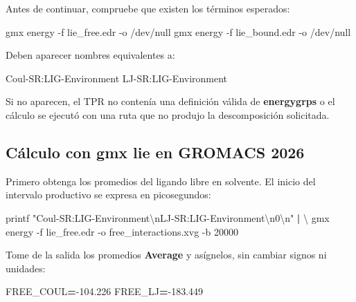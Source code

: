 \documentclass[
  spanish,
  11pt,
  a4paper]{article}
\newenvironment{Shaded}{\begin{snugshade}}{\end{snugshade}}
\newcommand{\AttributeTok}[1]{\textcolor[rgb]{0.13,0.29,0.53}{#1}}
\newcommand{\BuiltInTok}[1]{#1}
\newcommand{\DataTypeTok}[1]{\textcolor[rgb]{0.13,0.29,0.53}{#1}}
\newcommand{\ExtensionTok}[1]{#1}
\newcommand{\KeywordTok}[1]{\textcolor[rgb]{0.13,0.29,0.53}{\textbf{#1}}}
\newcommand{\NormalTok}[1]{#1}
\newcommand{\OperatorTok}[1]{\textcolor[rgb]{0.81,0.36,0.00}{\textbf{#1}}}
\newcommand{\StringTok}[1]{\textcolor[rgb]{0.31,0.60,0.02}{#1}}
\newcommand{\VariableTok}[1]{\textcolor[rgb]{0.00,0.00,0.00}{#1}}
\begin{document}
Antes de continuar, compruebe que existen los términos esperados:

\begin{Shaded}
\begin{Highlighting}[]
\ExtensionTok{gmx}\NormalTok{ energy }\AttributeTok{{-}f}\NormalTok{ lie\_free.edr }\AttributeTok{{-}o}\NormalTok{ /dev/null}
\ExtensionTok{gmx}\NormalTok{ energy }\AttributeTok{{-}f}\NormalTok{ lie\_bound.edr }\AttributeTok{{-}o}\NormalTok{ /dev/null}
\end{Highlighting}
\end{Shaded}

Deben aparecer nombres equivalentes a:

\begin{Shaded}
\begin{Highlighting}[]
\NormalTok{Coul{-}SR:LIG{-}Environment}
\NormalTok{LJ{-}SR:LIG{-}Environment}
\end{Highlighting}
\end{Shaded}

Si no aparecen, el TPR no contenía una definición válida de
\textbf{energygrps} o el cálculo se ejecutó con una ruta que no produjo
la descomposición solicitada.

\subsection{Cálculo con gmx lie en GROMACS
2026}\label{cuxe1lculo-con-gmx-lie-en-gromacs-2026}

Primero obtenga los promedios del ligando libre en solvente. El inicio
del intervalo productivo se expresa en picosegundos:

\begin{Shaded}
\begin{Highlighting}[]
\BuiltInTok{printf} \StringTok{"Coul{-}SR:LIG{-}Environment\textbackslash{}nLJ{-}SR:LIG{-}Environment\textbackslash{}n0\textbackslash{}n"} \KeywordTok{|} \DataTypeTok{\textbackslash{}}
  \ExtensionTok{gmx}\NormalTok{ energy }\AttributeTok{{-}f}\NormalTok{ lie\_free.edr }\AttributeTok{{-}o}\NormalTok{ free\_interactions.xvg }\AttributeTok{{-}b}\NormalTok{ 20000}
\end{Highlighting}
\end{Shaded}

Tome de la salida los promedios \textbf{Average} y asígnelos, sin
cambiar signos ni unidades:

\begin{Shaded}
\begin{Highlighting}[]
\VariableTok{FREE\_COUL}\OperatorTok{=}\NormalTok{{-}104.226}
\VariableTok{FREE\_LJ}\OperatorTok{=}\NormalTok{{-}183.449}
\end{Highlighting}
\end{Shaded}
\end{document}

